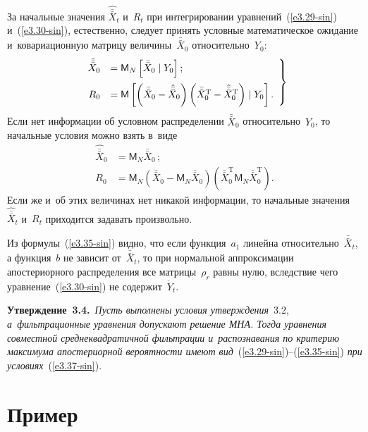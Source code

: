 \begin{multicols}{2}
  \vspace*{-2pt}

За начальные значения $\hat{\bar{\bar X}}_t$ и~$R_t$  при интегрировании
уравнений~(\ref{e3.29-sin}) и~(\ref{e3.30-sin}), естественно, следует принять
условные математическое ожидание и~ковариационную матрицу величины~$\bar{\bar X}_0$ относительно~$Y_0$:
  \begin{equation}
  \left.
  \begin{array}{rl}
  \hat{\bar{\bar X}}_0 &= \mathsf{M}_N\left[ \bar{\bar X}_0 \mid Y_0\right];\\[9pt]
   R_0 &= \mathsf{M} \left[ \left(\bar{\bar X}_0 -\hat{\bar{\bar X}}_0\right) 
   \left(\bar{\bar X}_0^{\mathrm{T}} -\hat{\bar{\bar X}}_0^{\mathrm{T}}\right)\mid
    Y_0\right].
    \end{array}
    \right\}
    \label{e3.37-sin}
    \end{equation}
 Если нет
информации об условном распределении $\bar{\bar X}_0$ относительно~$Y_0$, то
начальные условия можно взять в~виде  
\begin{align*}
\hat{\bar{\bar X}}_0 &=\mathsf{M}_N \bar{\bar X}_0\,;\\
R_0&= \mathsf{M}_N\left(\bar{\bar X}_0-\mathsf{M}_N \bar{\bar X}_0\right) \left(\bar{\bar X}_0^{\mathrm{T}} \mathsf{M}_N \bar{\bar X}_0^{\mathrm{T}}\right).
\end{align*}
 Если
же и~об этих величинах нет никакой информации, то начальные
значения~$\hat{\bar{\bar X}}_t$ и~$R_t$ приходится задавать произвольно.


Из формулы~(\ref{e3.35-sin}) видно, что если функция~$a_1$ линейна
относительно~$\bar{\bar X}_t$, а функция~$b$ не зависит от~$\bar{\bar X}_t$, то при
нормальной аппроксимации апостериорного распределения все матрицы~$\rho_r$ 
равны нулю, вследствие чего уравнение~(\ref{e3.30-sin}) не содержит~$\dot Y_t$.
{

}

\smallskip

\noindent
\textbf{Утверждение~3.4.}\ \textit{Пусть выполнены условия утверждения}~3.2, 
\textit{а~фильт\-ра\-ци\-он\-ные уравнения допускают решение МНА. 
Тогда уравнения совместной среднеквадратичной фильтрации и~распознавания по критерию 
максимума апостериорной вероятности имеют вид}~(\ref{e3.29-sin})--(\ref{e3.35-sin}) 
\textit{при условиях}~(\ref{e3.37-sin}).



\section{Пример}


\end{multicols}

